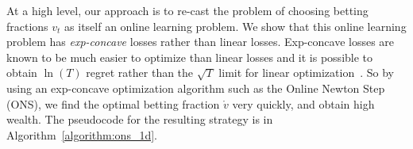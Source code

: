 \documentclass[12pt]{colt2018} %
\newcommand{\wealth}{\text{Wealth}}
\newcommand{\w}{\mathring{w}}
\renewcommand{\v}{\mathring{v}}
\begin{document}
At a high level, our approach is to re-cast the problem of choosing betting fractions $v_t$ as itself an online learning problem. We show that this online learning problem has \emph{exp-concave} losses rather than linear losses. Exp-concave losses are known to be much easier to optimize than linear losses and it is possible to obtain $\ln(T)$ regret rather than the $\sqrt{T}$ limit for linear optimization~\cite{hazan2007logarithmic}. So by using an exp-concave optimization algorithm such as the Online Newton Step (ONS), we find the optimal betting fraction $\v$ very quickly, and obtain high wealth. The pseudocode for the resulting strategy is in Algorithm~\ref{algorithm:ons_1d}.
\begin{comment}
\begin{enumerate}
  \item Observe by Fenchel duality that a bound $\wealth_T\ge f_T\left(-\sum_{t=1}^T g_t\right)$ for some function $f_T$ implies $R_T(\w)\le \epsilon + f_T^\star(\w)$ where $f_T^\star$ is the Fenchel conjugate. This allows us to reduce the problem of obtaining low regret to the one of obtaining high wealth and is the starting point for all coin betting analyses.

  \item Consider the function $\wealth_T(\v)$, the wealth of an algorithm that always bets a constant fraction $v_t=\v$. Compute
  \begin{equation}
  \ln \wealth_T(\v) - \ln \wealth_T = \sum_{t=1}^T -\ln(1-g_tv_t)+\ln(1-g_t\v),\label{eqn:wealthregret}
  \end{equation}
  and interpret the RHS of (\ref{eqn:wealthregret}) as the regret $R(\v)$ of an online learning algorithm choosing $v_t$ in response to loss functions $\ell_t(v)=-\ln(1+vg_t)$. Thus, $\ln \wealth_T = \ln \wealth_T(\v) - R(\v)$ for any $\v$.

  \item Observe that $\ell(v)=-\ln(1-vg_t)$ is exp-concave (this means that $\exp(-\ell(v))$ is a concave function). Exp-concave functions are easier online optimization than general convex functions, and we can use the ONS algorithm to choose $v_t$ and obtain $R(\v)=O(\ln(T))$.

  \item Exhibit a specific $\v$ such that $\ln \wealth_T(\v) - R(\v)$ is large enough to guarantee the desired regret by the Fenchel conjugate argument in step 1.
\end{enumerate}
\end{comment}
\end{document}
